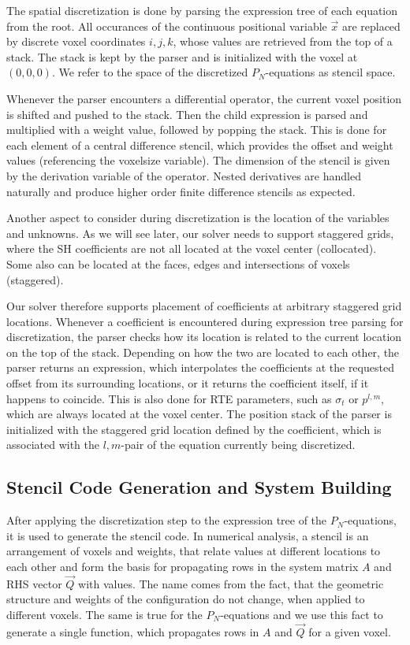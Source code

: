 The spatial discretization is done by parsing the expression tree of each equation from the root. All occurances of the continuous positional variable $\vec{x}$ are replaced by discrete voxel coordinates $i,j,k$, whose values are retrieved from the top of a stack. The stack is kept by the parser and is initialized with the voxel at $(0,0,0)$. We refer to the space of the discretized $P_N$-equations as stencil space.

Whenever the parser encounters a differential operator, the current voxel position is shifted and pushed to the stack. Then the child expression is parsed and multiplied with a weight value, followed by popping the stack. This is done for each element of a central difference stencil, which provides the offset and weight values (referencing the voxelsize variable). The dimension of the stencil is given by the derivation variable of the operator. Nested derivatives are handled naturally and produce higher order finite difference stencils as expected.

Another aspect to consider during discretization is the location of the variables and unknowns. As we will see later, our solver needs to support staggered grids, where the SH coefficients are not all located at the voxel center (collocated). Some also can be located at the faces, edges and intersections of voxels (staggered).

Our solver therefore supports placement of coefficients at arbitrary staggered grid locations. Whenever a coefficient is encountered during expression tree parsing for discretization, the parser checks how its location is related to the current location on the top of the stack. Depending on how the two are located to each other, the parser returns an expression, which interpolates the coefficients at the requested offset from its surrounding locations, or it returns the coefficient itself, if it happens to coincide. This is also done for RTE parameters, such as $\sigma_t$ or $p^{l,m}$, which are always located at the voxel center. The position stack of the parser is initialized with the staggered grid location defined by the coefficient, which is associated with the $l,m$-pair of the equation currently being discretized.

\subsection{Stencil Code Generation and System Building}

After applying the discretization step to the expression tree of the $P_N$-equations, it is used to generate the stencil code. In numerical analysis, a stencil is an arrangement of voxels and weights, that relate values at different locations to each other and form the basis for propagating rows in the system matrix $A$ and RHS vector $\vec{Q}$ with values. The name comes from the fact, that the geometric structure and weights of the configuration do not change, when applied to different voxels. The same is true for the $P_N$-equations and we use this fact to generate a single function, which propagates rows in $A$ and $\vec{Q}$ for a given voxel.

